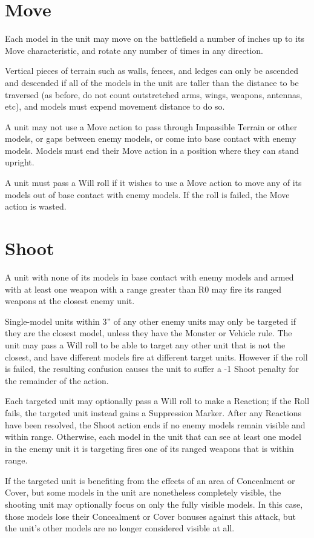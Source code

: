 \begin{multicols}{2}
\section*{Move}
Each model in the unit may move on the battlefield a number of inches up to its Move characteristic, and rotate any number of times in any direction.

Vertical pieces of terrain such as walls, fences, and ledges can only be ascended and descended if all of the models in the unit are taller than the distance to be traversed (as before, do not count outstretched arms, wings, weapons, antennas, etc), and models must expend movement distance to do so.

A unit may not use a Move action to pass through Impassible Terrain or other models, or gaps between enemy models, or come into base contact with enemy models. Models must end their Move action in a position where they can stand upright. 

A unit must pass a Will roll if it wishes to use a Move action to move any of its models out of base contact with enemy models. If the roll is failed, the Move action is wasted.




\section*{Shoot}
A unit with none of its models in base contact with enemy models and armed with at least one weapon with a range greater than R0 may fire its ranged weapons at the closest enemy unit.

Single-model units within 3'' of any other enemy units may only be targeted if they are the closest model, unless they have the Monster or Vehicle rule. The unit may pass a Will roll to be able to target any other unit that is not the closest, and have different models fire at different target units. However if the roll is failed, the resulting confusion causes the unit to suffer a -1 Shoot penalty for the remainder of the action.

Each targeted unit may optionally pass a Will roll to make a Reaction; if the Roll fails, the targeted unit instead gains a Suppression Marker. After any Reactions have been resolved, the Shoot action ends if no enemy models remain visible and within range. Otherwise, each model in the unit that can see at least one model in the enemy unit it is targeting fires one of its ranged weapons that is within range.

If the targeted unit is benefiting from the effects of an area of Concealment or Cover, but some models in the unit are nonetheless completely visible, the shooting unit may optionally focus on only the fully visible models. In this case, those models lose their Concealment or Cover bonuses against this attack, but the unit's other models are no longer considered visible at all.


\end{multicols}
